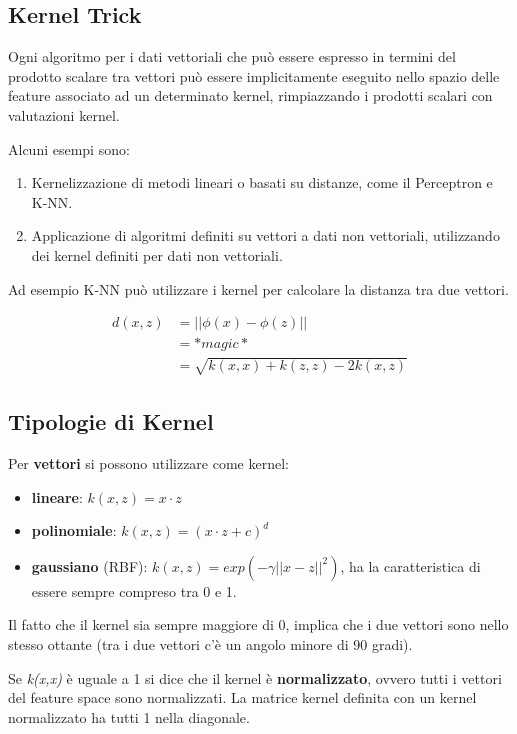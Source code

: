 \subsection{Kernel Trick}\label{kernel-trick}

Ogni algoritmo per i dati vettoriali che può essere espresso in termini
del prodotto scalare tra vettori può essere implicitamente eseguito nello
spazio delle feature associato ad un determinato kernel, rimpiazzando i
prodotti scalari con valutazioni kernel.

Alcuni esempi sono:
\begin{enumerate}
\item
  Kernelizzazione di metodi lineari o basati su distanze, come il
  Perceptron e K-NN.
\item
  Applicazione di algoritmi definiti su vettori a dati non vettoriali,
  utilizzando dei kernel definiti per dati non vettoriali.
\end{enumerate}

Ad esempio K-NN può utilizzare i kernel per calcolare la distanza tra
due vettori.

\begin{align*}
d(x,z) &= ||\phi(x) - \phi(z)|| \\
          &= *magic* \\
          &= \sqrt{k(x,x) + k(z,z) - 2k(x,z)}
\end{align*}

\subsection{Tipologie di Kernel}\label{tipologie-di-kernel}

Per \textbf{vettori} si possono utilizzare come kernel:

\begin{itemize}
\item
  \textbf{lineare}: $k(x,z) = x \cdot z$
\item
  \textbf{polinomiale}: $k(x,z) = (x \cdot z + c)^d$
\item
  \textbf{gaussiano} (RBF): $k(x,z) = exp(-\gamma||x-z||^2)$, ha la
  caratteristica di essere sempre compreso tra 0 e 1.
\end{itemize}

Il fatto che il kernel sia sempre maggiore di 0, implica che i due
vettori sono nello stesso ottante (tra i due vettori c'è un angolo
minore di 90 gradi).

Se \emph{k(x,x)} è uguale a 1 si dice che il kernel è
\textbf{normalizzato}, ovvero tutti i vettori del feature space sono
normalizzati. La matrice kernel definita con un kernel normalizzato ha
tutti 1 nella diagonale.


